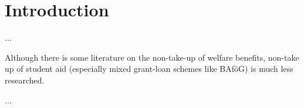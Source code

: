 \section{Introduction} \label{sec:intro}

...

Although there is some literature on the non-take-up of welfare benefits, non-take up of student aid (especially mixed grant-loan schemes like BAföG) is much less researched.

...
